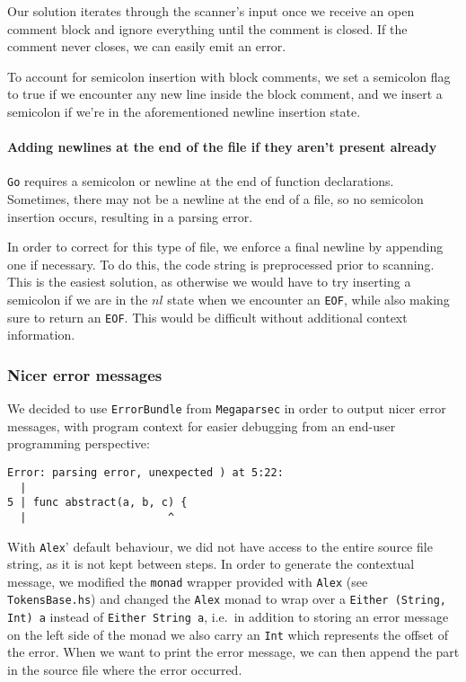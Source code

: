 \documentclass[11pt]{article}
\begin{document}
Our solution iterates through the scanner's input once we receive an
open comment block and ignore everything until the comment is closed.
If the comment never closes, we can easily emit an error.

To account for semicolon insertion with block comments, we set a
semicolon flag to true if we encounter any new line inside the block
comment, and we insert a semicolon if we're in the aforementioned
newline insertion state.
\paragraph{Adding newlines at the end of the file if they aren't
  present already}
\texttt{Go} requires a semicolon or newline at the end of function
declarations. Sometimes, there may not be a newline at the end of a
file, so no semicolon insertion occurs, resulting in a parsing error.

In order to correct for this type of file, we enforce a final newline
by appending one if necessary. To do this, the code string is
preprocessed prior to scanning. This is the easiest solution, as
otherwise we would have to try inserting a semicolon if we are in the
\(nl\) state when we encounter an \texttt{EOF}, while also making sure
to return an \texttt{EOF}. This would be difficult without additional
context information.
\subsubsection{Nicer error messages}
We decided to use \texttt{ErrorBundle} from \texttt{Megaparsec}\cite{github:megaparsec} in
order to output nicer error messages, with program context for easier
debugging from an end-user programming perspective:

\begin{verbatim}
Error: parsing error, unexpected ) at 5:22:
  |
5 | func abstract(a, b, c) {
  |                      ^
\end{verbatim}

With \texttt{Alex}' default behaviour, we did not have access to the
entire source file string, as it is not kept between steps. In order
to generate the contextual message, we modified the \texttt{monad}
wrapper provided with \texttt{Alex} (see \texttt{TokensBase.hs}) and
changed the \texttt{Alex} monad to wrap over a \texttt{Either (String,
  Int) a} instead of \texttt{Either String a}, i.e.\ in addition to
storing an error message on the left side of the monad we also carry
an \texttt{Int} which represents the offset of the error. When we want
to print the error message, we can then append the part in the source
file where the error occurred.
\end{document}

